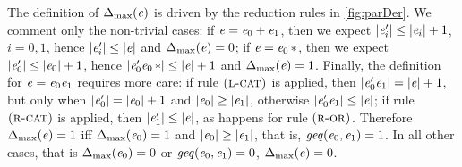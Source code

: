 The definition of $\incFun{\re}$ is driven by the reduction rules in \cref{fig:parDer}. We comment only the non-trivial cases: if $\re=\re_0\orop\re_1$, then we expect $\theight{\re'_i}\leq\theight{\re_i}+1$, $i=0,1$,
hence $\theight{\re'_i}\leq\theight{\re}$ and $\incFun{\re}=0$;
if $\re=\starop{\re_0}$, then we expect $\theight{\re'_0}\leq\theight{\re_0}+1$,
hence $\theight{\re'_0\catop\starop{\re_0}}\leq\theight{\re}+1$ and $\incFun{\re}=1$. Finally, the definition for $\re=\re_0\catop\re_1$ requires more care:
if rule $\rn{l-cat}$ is applied, then $\theight{\re_0'\catop\re_1}=\theight{\re}+1$, but only when $\theight{\re_0'}=\theight{\re_0}+1$ and $\theight{\re_0}\geq\theight{\re_1}$, otherwise $\theight{\re_0'\catop\re_1}\leq\theight{\re}$; if rule $\rn{r-cat}$ is applied, then $\theight{\re'_1}\leq\theight{\re}$, as happens for rule $\rn{r-or}$. Therefore $\incFun{\re}=1$ iff $\incFun{\re_0}=1$ and $\theight{\re_0}\geq\theight{\re_1}$, that is, $\geqFun{\re_0}{\re_1}=1$. In all other cases, that is $\incFun{\re_0}=0$ or $\geqFun{\re_0}{\re_1}=0$, $\incFun{\re}=0$.

